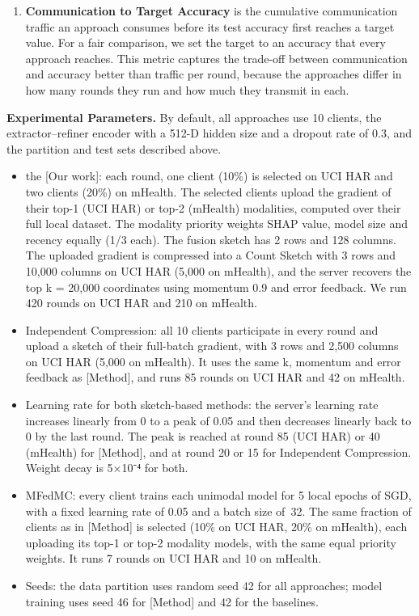 \documentclass[sigconf]{acmart}
\begin{document}
\begin{enumerate}
   \item 
  {\bfseries   Communication to Target Accuracy}
    is the cumulative communication traffic an approach consumes before its test accuracy first reaches a target value. For a fair comparison, we set the target to an accuracy that every approach reaches. This metric captures the trade-off between communication and accuracy better than traffic per round, because the approaches differ in how many rounds they run and how much they transmit in each.
\end{enumerate}


{\bfseries Experimental Parameters.}
 By default, all approaches use 10 clients, the extractor–refiner encoder with a 512-D hidden size and a dropout rate of 0.3, and the partition and test sets described above.

\begin{itemize}
\item the [Our work]: each round, one client (10\%) is selected on UCI HAR and two clients (20\%) on mHealth. The selected clients upload the gradient of their top-1 (UCI HAR) or top-2 (mHealth) modalities, computed over their full local dataset. The modality priority weights SHAP value, model size and recency equally (1/3 each). The fusion sketch has 2 rows and 128 columns. The uploaded gradient is compressed into a Count Sketch with 3 rows and 10,000 columns on UCI HAR (5,000 on mHealth), and the server recovers the top k = 20,000 coordinates using momentum 0.9 and error feedback. We run 420 rounds on UCI HAR and 210 on mHealth.
\item Independent Compression: all 10 clients participate in every round and upload a sketch of their full-batch gradient, with 3 rows and 2,500 columns on UCI HAR (5,000 on mHealth). It uses the same k, momentum and error feedback as [Method], and runs 85 rounds on UCI HAR and 42 on mHealth.
\item Learning rate for both sketch-based methods: the server's learning rate increases linearly from 0 to a peak of 0.05 and then decreases linearly back to 0 by the last round. The peak is reached at round 85 (UCI HAR) or 40 (mHealth) for [Method], and at round 20 or 15 for Independent Compression. Weight decay is 5×10⁻⁴ for both.
\item  MFedMC: every client trains each unimodal model for 5 local epochs of SGD, with a fixed learning rate of 0.05 and a batch size of 32. The same fraction of clients as in [Method] is selected (10\% on UCI HAR, 20\% on mHealth), each uploading its top-1 or top-2 modality models, with the same equal priority weights. It runs 7 rounds on UCI HAR and 10 on mHealth.
\item  Seeds: the data partition uses random seed 42 for all approaches; model training uses seed 46 for [Method] and 42 for the baselines.
\end{itemize}
\end{document}
